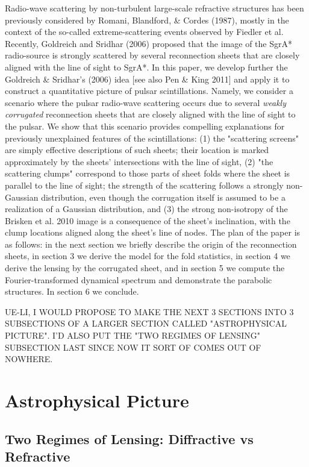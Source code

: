 \documentclass[useAMS,usenatbib]{mn2e}
\begin{document}
Radio-wave scattering by non-turbulent large-scale refractive structures has been previously
considered by Romani, Blandford, \& Cordes (1987), mostly in the context of the so-called
extreme-scattering events observed by Fiedler et al. Recently, Goldreich and Sridhar (2006) proposed that the image of the SgrA* radio-source is 
strongly scattered by several reconnection sheets that are closely aligned with the line of sight to
SgrA*.
In this paper, we develop further the Goldreich \& Sridhar's (2006) idea [see also Pen \& King 2011] 
and apply it to construct a quantitative
picture of pulsar scintillations. Namely, we consider a scenario where
the pulsar radio-wave scattering occurs due to several {\it weakly corrugated} 
reconnection sheets that are
closely aligned with the line of sight to the pulsar.  We show that this scenario provides
compelling explanations for previously unexplained features of the scintillations: 
(1)  the "scattering screens" are simply effective descriptions of such sheets; their location is marked 
approximately
by the sheets' intersections with the line of sight, (2) "the scattering clumps" correspond to 
those parts of sheet folds where the sheet is parallel 
to
the line of sight; the strength of the scattering follows a strongly non-Gaussian distribution, even though
the corrugation itself is assumed to be a realization of a Gaussian distribution, and (3) the
strong non-isotropy of the Brisken et al. 2010 image is a consequence of the sheet's inclination, 
with the clump locations aligned along the sheet's line of nodes. The plan of the paper is
as follows: in the next section we briefly describe the origin of the
reconnection sheets, in section 3  we derive the model for the fold statistics,
in section 4 we derive the lensing by the corrugated sheet, and in section 5 we compute the
Fourier-transformed dynamical spectrum and demonstrate the parabolic structures. In section 6 we conclude.

UE-LI, I WOULD PROPOSE TO MAKE THE NEXT 3 SECTIONS INTO 3 SUBSECTIONS OF A LARGER SECTION
CALLED "ASTROPHYSICAL PICTURE".  I'D ALSO PUT  THE "TWO REGIMES OF LENSING" SUBSECTION
LAST SINCE NOW IT SORT OF COMES OUT OF NOWHERE.

\section{Astrophysical Picture}

\subsection{Two Regimes of Lensing: Diffractive vs Refractive}
\end{document}
